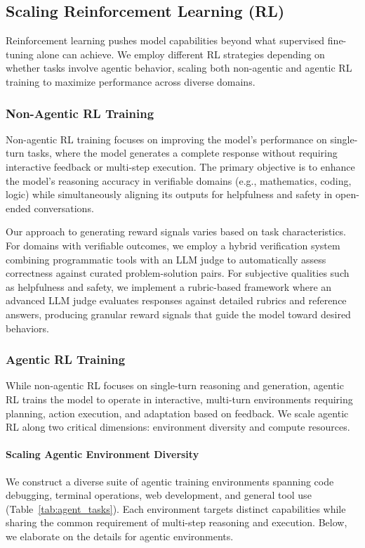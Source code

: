\subsection{Scaling Reinforcement Learning (RL)}
\label{subsec:scale_rl}

Reinforcement learning pushes model capabilities beyond what supervised fine-tuning alone can achieve. 
We employ different RL strategies depending on whether tasks involve agentic behavior, scaling both non-agentic and agentic RL training to maximize performance across diverse domains.

\subsubsection{Non-Agentic RL Training}

Non-agentic RL training focuses on improving the model's performance on single-turn tasks, where the model generates a complete response without requiring interactive feedback or multi-step execution. The primary objective is to enhance the model's reasoning accuracy in verifiable domains (e.g., mathematics, coding, logic) while simultaneously aligning its outputs for helpfulness and safety in open-ended conversations.

Our approach to generating reward signals varies based on task characteristics. For domains with verifiable outcomes, we employ a hybrid verification system combining programmatic tools with an LLM judge to automatically assess correctness against curated problem-solution pairs. 
For subjective qualities such as helpfulness and safety, we implement a rubric-based framework where an advanced LLM judge evaluates responses against detailed rubrics and reference answers, producing granular reward signals that guide the model toward desired behaviors.

\subsubsection{Agentic RL Training}


While non-agentic RL focuses on single-turn reasoning and generation, agentic RL trains the model to operate in interactive, multi-turn environments requiring planning, action execution, and adaptation based on feedback. We scale agentic RL along two critical dimensions: environment diversity and compute resources.

\paragraph{Scaling Agentic Environment Diversity} We construct a diverse suite of agentic training environments spanning code debugging, terminal operations, web development, and general tool use (Table~\ref{tab:agent_tasks}). Each environment targets distinct capabilities while sharing the common requirement of multi-step reasoning and execution. Below, we elaborate on the details for agentic environments.


